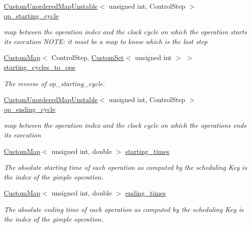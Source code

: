 \begin{DoxyCompactItemize}
\hyperlink{custom__map_8hpp_a8cbaceffc09790a885ec7e9c17809c69}{Custom\+Unordered\+Map\+Unstable}$<$ unsigned int, Control\+Step $>$ \hyperlink{classSchedule_ad9a0a7a8305f6db7d2dcd3a7d613179f}{op\+\_\+starting\+\_\+cycle}
\begin{DoxyCompactList}\small\item\em map between the operation index and the clock cycle on which the operation starts its execution N\+O\+TE\+: it must be a map to know which is the last step \end{DoxyCompactList}\item 
\hyperlink{custom__map_8hpp_a18ca01763abbe3e5623223bfe5aaac6b}{Custom\+Map}$<$ Control\+Step, \hyperlink{custom__set_8hpp_a615bc2f42fc38a4bb1790d12c759e86f}{Custom\+Set}$<$ unsigned int $>$ $>$ \hyperlink{classSchedule_a65835449ae73c073c23aeaa59cdf799b}{starting\+\_\+cycles\+\_\+to\+\_\+ops}
\begin{DoxyCompactList}\small\item\em The reverse of op\+\_\+starting\+\_\+cycle. \end{DoxyCompactList}\item 
\hyperlink{custom__map_8hpp_a8cbaceffc09790a885ec7e9c17809c69}{Custom\+Unordered\+Map\+Unstable}$<$ unsigned int, Control\+Step $>$ \hyperlink{classSchedule_a3264650e2087ccdfeaf2b2e822dce958}{op\+\_\+ending\+\_\+cycle}
\begin{DoxyCompactList}\small\item\em map between the operation index and the clock cycle on which the operations ends its execution \end{DoxyCompactList}\item 
\hyperlink{custom__map_8hpp_a18ca01763abbe3e5623223bfe5aaac6b}{Custom\+Map}$<$ unsigned int, double $>$ \hyperlink{classSchedule_a5204aafc8e7b40a16118dba7e66ba104}{starting\+\_\+times}
\begin{DoxyCompactList}\small\item\em The absolute starting time of each operation as computed by the scheduling Key is the index of the gimple operation. \end{DoxyCompactList}\item 
\hyperlink{custom__map_8hpp_a18ca01763abbe3e5623223bfe5aaac6b}{Custom\+Map}$<$ unsigned int, double $>$ \hyperlink{classSchedule_a572efad73e7017e5217bf0178084746a}{ending\+\_\+times}
\begin{DoxyCompactList}\small\item\em The absolute ending time of each operation as computed by the scheduling Key is the index of the gimple operation. \end{DoxyCompactList}\item 

\end{DoxyCompactItemize}
